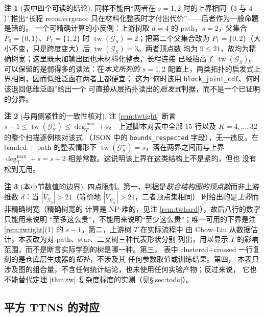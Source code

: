 \documentclass[a4paper,11pt]{article}
\theoremstyle{definition}
\newtheorem{remark}{注}
\newcommand{\1}{\mathbf 1}
\newcommand{\tw}{\operatorname{tw}}
\newcommand{\Gcal}{\mathcal G}
\begin{document}
\begin{remark}[表中四个可读的结论]
同样不能由“两者在 $s=1,2$ 时的上界相同（$3$ 与 $4$）”推出“长程
reconvergence 只在材料化整表时才付出代价”——后者作为一般命题是错的。
一个可精确计算的小反例：上游树取 $d=4$ 的 path，$s=2$，父集合
$P_0=\{0,1\}$、$P_1=\{1,2\}$ 时 $\tw(\Gcal_S)=2$；把第二个父集合改为
$P_1=\{0,2\}$（大小不变，只是跨度变大）后 $\tw(\Gcal_S)=3$。两者顶点数
均为 $9\le21$，故均为精确树宽；这里既未加输出团也未材料化整表，长程连接
已经抬高了 $\tw(\Gcal_S)$。可以保留的是弱得多的读法：在\emph{本文所列的}
$s=1,2$ 配置上，两类拓扑的启发式上界相同，因而低维泛函在两者上都便宜；
这为“何时该用 \texttt{block\_joint\_cdf}、何时该退回低维泛函”给出一个
可直接从层拓扑读出的\emph{启发式}判据，而不是一个已证明的分界。
\end{remark}

\begin{remark}[与两侧紧性的一致性核对]
\label{rem:twcheck}
注 \ref{rem:twtight} 断言 $s-1\le\tw(\Gcal_S^{+})\le\deg_T^{\max}+s$。
上述脚本对表中全部 $15$ 行以及 $K=4,\ldots,32$ 的整个扫描逐例核对该式
（JSON 中的 \texttt{bounds\_respected} 字段），无一违反。在 banded $+$
path 的整表情形下 $\tw(\Gcal_S^{+})=s$，落在两界之间而与上界
$\deg_T^{\max}+s=s+2$ 相差常数。这说明该上界在这类结构上不是紧的，但也
没有松到无用。
\end{remark}

\begin{remark}[本小节数值的边界]
\label{rem:twnumbounds}
四点限制。第一，判据是\emph{联合结构图的顶点数}而非上游维数 $d$：当
$|V_{\mathcal G_S}|>21$（等价地 $|V_{\mathcal G_S^+}|>21$，二者顶点集相同）
时给出的是\emph{上界}而非精确树宽（精确树宽的
计算是 NP-难的，见注 \ref{rem:twhard}），故后八行的数字只能用来说明
“至多这么贵”，不能用来说明“至少这么贵”；唯一可用的下界是注
\ref{rem:twtight}(1) 的 $s-1$。第二，上游树 $T$ 在实际流程中
由 Chow--Liu 从数据估计，本表改为对 path、star、二叉树三种代表形状分别
列出，用以显示 $T$ 的影响范围，而不是断言实际学到的树是哪一种。第三，
表中 clustered$+$crossed 一行复刻的是仓库层生成器的\emph{拓扑}，不涉及其
任何参数取值或训练结果。第四，
本表只涉及图的组合量，不含任何统计结论，也未使用任何实验产物；反过来说，
它也不能替代定理 \ref{thm:tw} 复杂度标度的实测（见\S\ref{sec:todo}）。
\end{remark}

\subsection{平方 TTNS 的对应}
\end{document}
